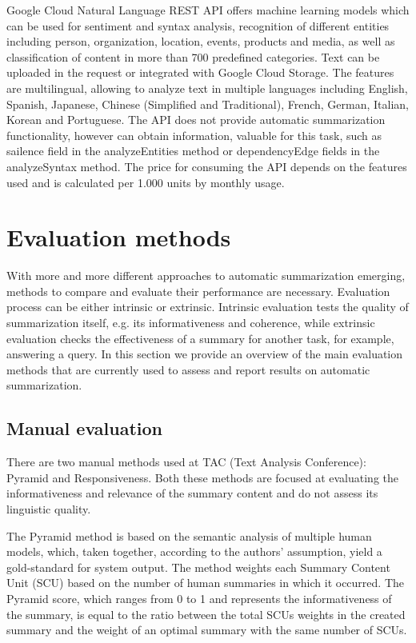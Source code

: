 \documentclass[11pt,a4paper,onecolumn]{article}
\begin{document}
Google Cloud Natural Language REST API \cite{googleapi} offers machine learning models which can be used for sentiment and syntax analysis, recognition of different entities including person, organization, location, events, products and media, as well as classification of content in more than 700 predefined categories.
Text can be uploaded in the request or integrated with Google Cloud Storage.
The features are multilingual, allowing to analyze text in multiple languages including English, Spanish, Japanese, Chinese (Simplified and Traditional), French, German, Italian, Korean and Portuguese.
The API does not provide automatic summarization functionality, however can obtain information, valuable for this task, such as sailence field in the analyzeEntities method or dependencyEdge fields in the analyzeSyntax method.
The price for consuming the API depends on the features used and is calculated per 1.000 units by monthly usage.


\section{Evaluation methods} \label{evaluation}
With more and more different approaches to automatic summarization emerging, methods to compare and evaluate their performance are necessary.
Evaluation process can be either intrinsic or extrinsic.
Intrinsic evaluation tests the quality of summarization itself, e.g. its informativeness and coherence, while extrinsic evaluation checks the effectiveness of a summary for another task, for example, answering a query.
In this section we provide an overview of the main evaluation methods that are currently used to assess and report results on automatic summarization.

\subsection{Manual evaluation}
There are two manual methods used at TAC (Text Analysis Conference): Pyramid and Responsiveness.
Both these methods are focused at evaluating the informativeness and relevance of the summary content and do not assess its linguistic quality.

The Pyramid method \cite{nenkova2007pyramid} is based on the semantic analysis of multiple human models, which, taken together, according to the authors' assumption, yield a gold-standard for system output.
The method weights each Summary Content Unit (SCU) based on the number of human summaries in which it occurred.
The Pyramid score, which ranges from 0 to 1 and represents the informativeness of the summary, is equal to the ratio between the total SCUs weights in the created summary and the weight of an optimal summary with the same number of SCUs.
\end{document}
